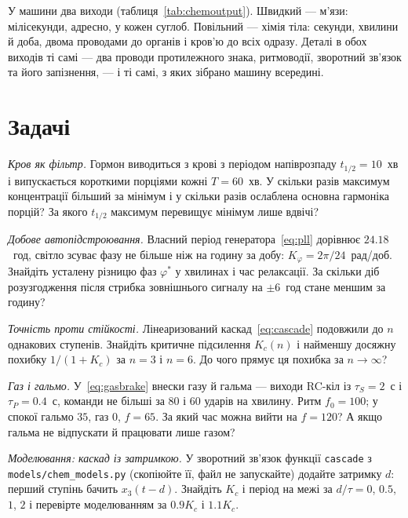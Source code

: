 У машини два виходи (таблиця~\ref{tab:chemoutput}). Швидкий --- м'язи: мілісекунди, адресно, у кожен суглоб. Повільний --- хімія тіла: секунди, хвилини й доба, двома проводами до органів і кров'ю до всіх одразу. Деталі в обох виходів ті самі --- два проводи протилежного знака, ритмоводії, зворотний зв'язок та його запізнення, --- і ті самі, з яких зібрано машину всередині.

\section{Задачі}

\begin{exercise}[\lvlA]
\label{ex:16:1}
\emph{Кров як фільтр.} Гормон виводиться з крові з періодом напіврозпаду $t_{1/2}=10$~хв і випускається короткими порціями кожні $T=60$~хв. У скільки разів максимум концентрації більший за мінімум і у скільки разів ослаблена основна гармоніка порцій? За якого $t_{1/2}$ максимум перевищує мінімум лише вдвічі?
\end{exercise}

\begin{exercise}[\lvlA]
\label{ex:16:2}
\emph{Добове автопідстроювання.} Власний період генератора~\eqref{eq:pll} дорівнює $24.18$~год, світло зсуває фазу не більше ніж на годину за добу: $K_\varphi=2\pi/24$~рад/доб. Знайдіть усталену різницю фаз $\varphi^*$ у хвилинах і час релаксації. За скільки діб розузгодження після стрибка зовнішнього сигналу на $\pm6$~год стане меншим за годину?
\end{exercise}

\begin{exercise}[\lvlB]
\label{ex:16:3}
\emph{Точність проти стійкості.} Лінеаризований каскад~\eqref{eq:cascade} подовжили до $n$ однакових ступенів. Знайдіть критичне підсилення $K_c(n)$ і найменшу досяжну похибку $1/(1+K_c)$ за $n=3$ і $n=6$. До чого прямує ця похибка за $n\to\infty$?
\end{exercise}

\begin{exercise}[\lvlB]
\label{ex:16:4}
\emph{Газ і гальмо.} У~\eqref{eq:gasbrake} внески газу й гальма --- виходи RC-кіл із $\tau_S=2$~с і $\tau_P=0.4$~с, команди не більші за $80$ і $60$ ударів на хвилину. Ритм $f_0=100$; у спокої гальмо $35$, газ $0$, $f=65$. За який час можна вийти на $f=120$? А якщо гальма не відпускати й працювати лише газом?
\end{exercise}

\begin{exercise}[\lvlB]
\label{ex:16:5}
\emph{Моделювання: каскад із затримкою.} У зворотний зв'язок функції \texttt{cascade} з \texttt{models/\allowbreak chem\_models.py} (скопіюйте її, файл не запускайте) додайте затримку $d$: перший ступінь бачить $x_3(t-d)$. Знайдіть $K_c$ і період на межі за $d/\tau=0$, $0.5$, $1$, $2$ і перевірте моделюванням за $0.9K_c$ і $1.1K_c$.
\end{exercise}

